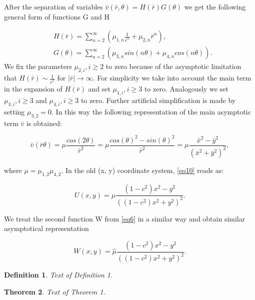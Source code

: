 \documentclass[12pt]{article}
\theoremstyle{theorem}
\newtheorem{theorem}{Theorem}
\theoremstyle{defi}
\newtheorem{definition}[theorem]{Definition}
\begin{document}
After the separation of variables $\bar{v}(\bar{r}, \theta) = H(\bar{r})G(\theta)$  we get the following general form of functions G and H 

\begin{align}
&H(\bar{r}) = \sum^{\infty}_{n=2} (\mu_{1,n} \frac{1}{ \bar{r}^n} + \mu_{2,n} \bar{r}^n ),
\\ \nonumber &G(\theta) = \sum^{\infty}_{n=2} (\mu_{3,n}sin(n \theta ) + \mu_{4,n}cos(n \theta)). \label{eq9}
\end{align}
We fix the parameters $\mu_{2,i}, i \geq 2$  to zero because of the asymptotic limitation that $H(\bar{r}) \sim \frac{1}{\bar{r}^2} $  for $|\bar{r}| \rightarrow \infty $.
For simplicity we take into account the main term in the expansion of $H(\bar{r})$ and set $\mu_{1,i}, i \geq 3$  to zero. Analogously we set $\mu_{3,i}, i \geq 3$ and $\mu_{4,i}, i \geq 3$
to zero.  Further artificial simplification is made by setting $\mu_{3,2} = 0$. In this way the following representation of the main asymptotic term $\bar{v}$ is obtained:

\begin{equation}
\bar{v}(\bar{r} \theta) = \mu \frac{cos(2 \theta)}{ \bar{r}^2 } = 
 \mu \frac{cos(\theta) ^ 2 - sin(\theta)^2}{ \bar{r}^2 } = 
 \mu \frac{\bar{x}  ^ 2 - \bar{y}  ^ 2}{( \bar{x}  ^ 2 + \bar{y}  ^ 2)^2 } , \label{eq10}
\end{equation}

where $\mu = \mu_{1,2} \mu_{4,2}$. In the old (x, y) coordinate system, \ref{eq10}  reads as:

\begin{equation}
U(x,y) = \mu \frac{(1-c^2)x^2 - y^2}{ ( (1-c^2)x^2 + y^2 )^2 }. \label{eq12}
\end{equation}

We treat the second function W from \ref{eq6}  in a similar way and obtain similar  asymptotical representation

\begin{equation}
W(x,y) = \hat{\mu} \frac{(1-c^2)x^2 - y^2}{ ( (1-c^2)x^2 + y^2 )^2 }. \label{eq13}
\end{equation}



\begin{definition}
Text of Definition 1.
\end{definition}

\begin{theorem}
Text of Theorem 1.
\end{theorem}
\end{document}
